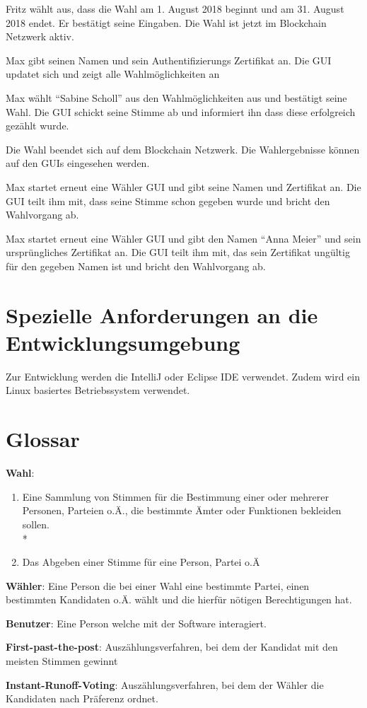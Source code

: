 \documentclass[parskip=full,11pt,twoside]{scrartcl}
\begin{document}
\teststep{}
		{Fritz wählt aus, dass die Wahl am 1. August 2018 beginnt und am 31. August 2018 endet. Er bestätigt seine Eingaben.}
		{Die Wahl ist jetzt im Blockchain Netzwerk aktiv.}

		{Max gibt seinen Namen und sein Authentifizierungs Zertifikat an.}
		{Die GUI updatet sich und zeigt alle Wahlmöglichkeiten an}
		
\teststep{}
		{Max wählt \enquote{Sabine Scholl} aus den Wahlmöglichkeiten aus und bestätigt seine Wahl.}
		{Die GUI schickt seine Stimme ab und informiert ihn dass diese erfolgreich gezählt wurde.}
		
		{Die Wahl beendet sich auf dem Blockchain Netzwerk.}
		{Die Wahlergebnisse können auf den GUIs eingesehen werden.}
		

		{Max startet erneut eine Wähler GUI und gibt seine Namen und Zertifikat an.}
		{Die GUI teilt ihm mit, dass seine Stimme schon gegeben wurde und bricht den Wahlvorgang ab.}

\teststep{}
		{Max startet erneut eine Wähler GUI und gibt den Namen \enquote{Anna Meier} und sein ursprüngliches Zertifikat an.}
		{Die GUI teilt ihm mit, das sein Zertifikat ungültig für den gegeben Namen ist und bricht den Wahlvorgang ab.}

\section{Spezielle Anforderungen an die Entwicklungsumgebung}
Zur Entwicklung werden die IntelliJ oder Eclipse IDE verwendet.
Zudem wird ein Linux basiertes Betriebssystem verwendet.

\section{Glossar}

\textbf{Wahl}:
\begin{enumerate}
	\item Eine Sammlung von Stimmen für die Bestimmung einer oder mehrerer Personen, Parteien o.Ä., die bestimmte Ämter oder Funktionen bekleiden sollen. \\*
	\item Das Abgeben einer Stimme für eine Person, Partei o.Ä
\end{enumerate}

\textbf{Wähler}:
Eine Person die bei einer Wahl eine bestimmte Partei, einen bestimmten Kandidaten o.Ä. wählt und die hierfür nötigen Berechtigungen hat.

\textbf{Benutzer}:
Eine Person welche mit der Software interagiert.

\textbf{First-past-the-post}:
Auszählungsverfahren, bei dem der Kandidat mit den meisten Stimmen gewinnt

\textbf{Instant-Runoff-Voting}:
Auszählungsverfahren, bei dem der Wähler die Kandidaten nach Präferenz ordnet.
\end{document}
